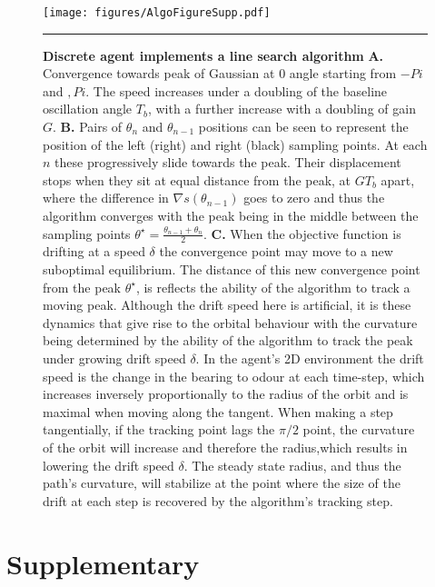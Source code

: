\documentclass[10pt,a4paper]{article}
\newcommand{\beginsupplement}{%
        \setcounter{table}{0}
        \renewcommand{\thetable}{S\arabic{table}}%
        \setcounter{figure}{0}
        \renewcommand{\thefigure}{S\arabic{figure}}%
     }
\begin{document}
\begin{figure}[!ht]
\begin{center}
\texttt{[image: figures/AlgoFigureSupp.pdf]}
\caption{{\bf Discrete agent implements a line search algorithm} {\bf A.} Convergence towards peak of Gaussian at 0 angle starting from $-Pi$ and $,Pi$. The speed increases under a doubling of the baseline oscillation angle $T_b$, with a further increase with a doubling of gain $G$.    
{\bf B.} Pairs of $\theta_n$ and $\theta_{n-1}$ positions can be seen to represent the position of the left (right) and right (black) sampling points. At each $n$ these progressively slide towards the peak. Their displacement stops when they sit at equal distance from the peak, at $G T_b$ apart, where the difference in $\nabla s(\theta_{n-1})$ goes to zero and thus the algorithm converges with the peak being in the middle between the sampling points $\theta^{\star} =\frac{\theta_{n-1}+\theta_n}{2}$.
{\bf C.} When the objective function is drifting at a speed $\delta$ the convergence point may move to a new suboptimal equilibrium. The distance of this new convergence point from the peak $\theta^{\star}$, is reflects the ability of the algorithm to track a moving peak. Although the drift speed here is artificial, it is these dynamics that give rise to the orbital behaviour with the curvature being determined by the ability of the algorithm to track the peak under growing drift speed $\delta$. 
In the agent's 2D environment the drift speed is the change in the bearing to odour at each time-step, which increases inversely proportionally to the radius of the orbit and is maximal when moving along the tangent. When making a step tangentially, if the tracking point lags the $\pi/2$ point, the curvature of the orbit will increase and therefore the radius,which results in lowering the drift speed $\delta$.   
 The steady state radius, and thus the path's curvature, will stabilize at the point where the size of the drift at each step is recovered by the algorithm's tracking step. 
\label{fig:AlgoAnalysis}}
\hrule
\end{center}
\end{figure}

\section{Supplementary}
\beginsupplement
\end{document}
